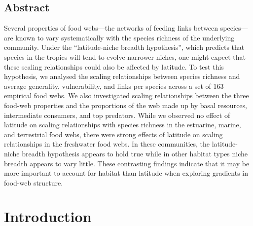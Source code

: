 \documentclass[12pt]{article}
\begin{document}
\begin{spacing}{1.0}
\section*{Abstract}

Several properties of food webs---the networks of feeding links between
species---are known to vary systematically with the species richness of the underlying
community.  Under the ``latitude-niche breadth hypothesis'', which predicts
that species in the tropics will tend to evolve narrower niches, one might
expect that these scaling relationships could also be affected by latitude. To
test this hypothesis, we analysed the scaling relationships between species
richness and average generality, vulnerability, and links per species across a
set of 163 empirical food webs.  We also investigated scaling relationships
between the three food-web properties and the proportions of the web made up
by basal resources, intermediate consumers, and top predators. While we
observed no effect of latitude on scaling relationships with species richness
in the estuarine, marine, and terrestrial food webs, there were strong effects
of latitude on scaling relationships in the freshwater food webs. In these
communities, the latitude-niche breadth hypothesis appears to hold true while
in other habitat types niche breadth appears to vary little. These contrasting
findings indicate that it may be more important to account for habitat than
latitude when exploring gradients in food-web structure.

\end{spacing}

\linenumbers

\section*{Introduction} 

\end{document}
